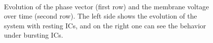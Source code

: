 \documentclass[12pt,a4paper]{article}
\begin{document}
\begin{figure}[H]
	\\	 
	\caption{Evolution of the phase vector (first row) and the membrane voltage over time (second row).
		The left side shows the evolution of the system with resting ICs, and on the right one can see the behavior under bursting ICs.}
	\label{subfig} 
\end{figure}

		





\end{document}
